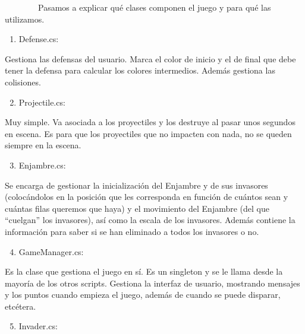 \documentclass[]{article}
\begin{document}

~~~~~~~~Pasamos a explicar qué clases componen el juego y para qué las
utilizamos.

\begin{enumerate}
\itemsep1pt\parskip0pt
\item
  Defense.cs:
\end{enumerate}

Gestiona las defensas del usuario. Marca el color de inicio y el de
final que debe tener la defensa para calcular los colores intermedios.
Además gestiona las colisiones.

\begin{enumerate}
\setcounter{enumi}{1}
\itemsep1pt\parskip0pt
\item
  Projectile.cs:
\end{enumerate}

Muy simple. Va asociada a los proyectiles y los destruye al pasar unos
segundos en escena. Es para que los proyectiles que no impacten con
nada, no se queden siempre en la escena.

\begin{enumerate}
\setcounter{enumi}{2}
\itemsep1pt\parskip0pt
\item
  Enjambre.cs:
\end{enumerate}

Se encarga de gestionar la inicialización del Enjambre y de sus
invasores (colocándolos en la posición que les corresponda en función de
cuántos sean y cuántas filas queremos que haya) y el movimiento del
Enjambre (del que ``cuelgan'' los invasores), así como la escala de los
invasores. Además contiene la información para saber si se han eliminado
a todos los invasores o no.

\begin{enumerate}
\setcounter{enumi}{3}
\itemsep1pt\parskip0pt
\item
  GameManager.cs:
\end{enumerate}

Es la clase que gestiona el juego en sí. Es un singleton y se le llama
desde la mayoría de los otros scripts. Gestiona la interfaz de usuario,
mostrando mensajes y los puntos cuando empieza el juego, además de
cuando se puede disparar, etcétera.

\begin{enumerate}
\setcounter{enumi}{4}
\itemsep1pt\parskip0pt
\item
  Invader.cs:
\end{enumerate}
\end{document}
